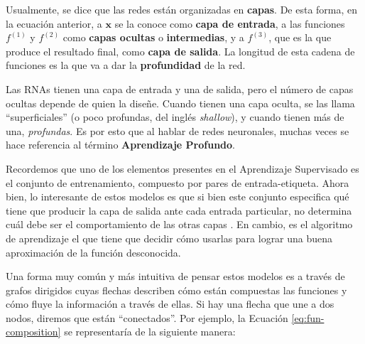 \documentclass[../../main.tex]{subfiles}
\begin{document}
Usualmente, se dice que las redes están organizadas en \textbf{capas}. De esta forma, en
la ecuación anterior, a \(\bm{x}\) se la conoce como \textbf{capa de entrada}, a las
funciones \(f^{(1)}\) y \(f^{(2)}\) como \textbf{capas ocultas} o \textbf{intermedias}, y
a \(f^{(3)}\), que es la que produce el resultado final, como \textbf{capa de salida}. La
longitud de esta cadena de funciones es la que va a dar la \textbf{profundidad} de la red.

Las RNAs tienen una capa de entrada y una de salida, pero el número de capas ocultas
depende de quien la diseñe. Cuando tienen una capa oculta, se las llama ``superficiales''
(o poco profundas, del inglés \textit{shallow}), y cuando tienen más de una,
\textit{profundas}. Es por esto que al hablar de redes neuronales, muchas veces se
hace referencia al término \textbf{Aprendizaje Profundo}.

Recordemos que uno de los elementos presentes en el Aprendizaje Supervisado es el conjunto
de entrenamiento, compuesto por pares de entrada-etiqueta. Ahora bien, lo interesante de
estos modelos es que si bien este conjunto especifica qué tiene que producir la capa de
salida ante cada entrada particular, no determina cuál debe ser el comportamiento de las
otras capas \cite{deep-learning}. En cambio, es el algoritmo de aprendizaje el que tiene
que decidir cómo usarlas para lograr una buena aproximación de la función desconocida.

Una forma muy común y más intuitiva de pensar estos modelos es a través de grafos
dirigidos cuyas flechas describen cómo están compuestas las funciones y cómo fluye la
información a través de ellas. Si hay una flecha que une a dos nodos, diremos que están
``conectados''. Por ejemplo, la Ecuación \ref{eq:fun-composition} se representaría de la
siguiente manera:
\begin{center}
\end{center}
\end{document}
